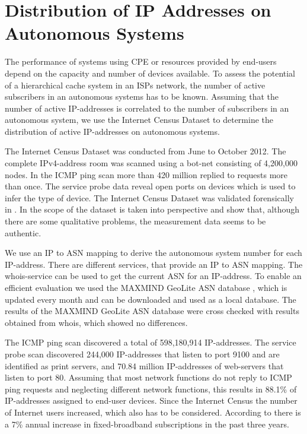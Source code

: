 \section{Distribution of IP Addresses on Autonomous Systems}\label{sec:aslevel:census}

The performance of systems using CPE or resources provided by end-users depend on the capacity and number of devices available.
To assess the potential of a hierarchical cache system in an ISPs network, the number of active subscribers in an autonomous systems has to be known.
Assuming that the number of active IP-addresses is correlated to the number of subscribers in an autonomous system, we use the Internet Census Dataset to determine the distribution of active IP-addresses on autonomous systems.

The Internet Census Dataset\cite{carna2013} was conducted from June to October 2012.
The complete IPv4-address room was scanned using a bot-net consisting of 4,200,000 nodes.
In the ICMP ping scan more than 420 million replied to requests more than once.
The service probe data reveal open ports on devices which is used to infer the type of device.
The Internet Census Dataset was validated forensically in \cite{dainotticaida}.
In \cite{krenc2014internet} the scope of the dataset is taken into perspective and show that, although there are some qualitative problems, the measurement data seems to be authentic.

We use an IP to ASN mapping to derive the autonomous system number for each IP-address. There are different services, that provide an IP to ASN mapping.
The whois-service can be used to get the current ASN for an IP-address.
To enable an efficient evaluation we used the MAXMIND GeoLite ASN database \cite{geo_ip}, which is updated every month and can be downloaded and used as a local database.
The results of the MAXMIND GeoLite ASN database were cross checked with results obtained from whois, which showed no differences.

The ICMP ping scan discovered a total of 598,180,914 IP-addresses.
The service probe scan discovered 244,000 IP-addresses that listen to port 9100 and are identified as print servers, and 70.84 million IP-addresses of web-servers that listen to port 80.
Assuming that most network functions do not reply to ICMP ping requests and neglecting different network functions, this results in 88.1\% of IP-addresses assigned to end-user devices.
Since the Internet Census the number of Internet users increased, which also has to be considered.
According to \cite{itu2015facts} there is a 7\% annual increase in fixed-broadband subscriptions in the past three years.

